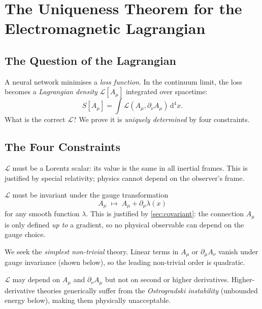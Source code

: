 \documentclass[12pt, a4paper]{article}
\theoremstyle{plain}
\theoremstyle{definition}
\theoremstyle{remark}
\newcommand{\Lag}{\mathcal{L}}
\newcommand{\Action}{S}
\renewcommand{\d}{\mathrm{d}}
\begin{document}
\section{The Uniqueness Theorem for the Electromagnetic Lagrangian}
\label{sec:uniqueness}

\subsection{The Question of the Lagrangian}

A neural network minimises a \emph{loss function}.  In the continuum limit, the loss becomes a \emph{Lagrangian density} $\Lag[A_\mu]$ integrated over spacetime:
\[
  \Action[A_\mu] = \int \Lag(A_\mu, \partial_\nu A_\mu)\,\d^4x.
\]
What is the correct $\Lag$?  We prove it is \emph{uniquely determined} by four constraints.

\subsection{The Four Constraints}

\begin{description}[leftmargin=2em, labelindent=1em]
  \item[C1 — Lorentz Covariance.] $\Lag$ must be a Lorentz scalar: its value is the same in all inertial frames.  This is justified by special relativity; physics cannot depend on the observer's frame.
  \item[C2 — Gauge Invariance.] $\Lag$ must be invariant under the gauge transformation
        \[
          A_\mu \;\longmapsto\; A_\mu + \partial_\mu\lambda(x)
        \]
        for any smooth function $\lambda$.  This is justified by \cref{sec:covariant}: the connection $A_\mu$ is only defined \emph{up to} a gradient, so no physical observable can depend on the gauge choice.
  \item[C3 — Quadratic in Fields.] We seek the \emph{simplest non-trivial} theory.  Linear terms in $A_\mu$ or $\partial_\mu A_\nu$ vanish under gauge invariance (shown below), so the leading non-trivial order is quadratic.
  \item[C4 — At Most First-Order Derivatives.] $\Lag$ may depend on $A_\mu$ and $\partial_\nu A_\mu$ but not on second or higher derivatives.  Higher-derivative theories generically suffer from the \emph{Ostrogradski instability} (unbounded energy below), making them physically unacceptable.
\end{description}
\end{document}

